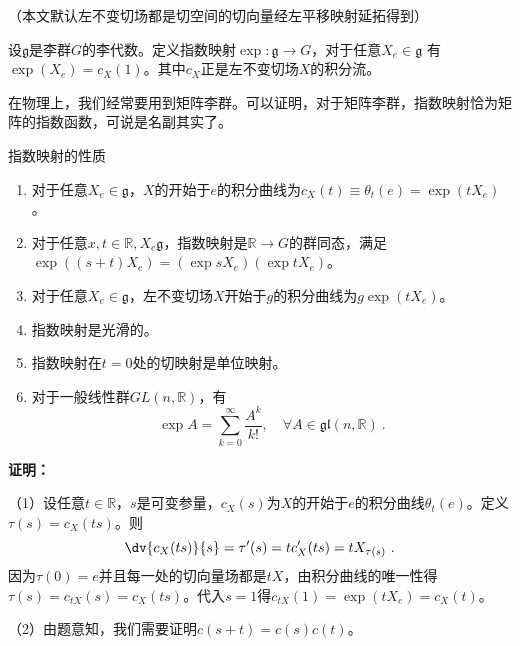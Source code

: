 
（本文默认左不变切场都是切空间的切向量经左平移映射延拓得到）
\begin{definition}{}
设$\mathfrak g$是李群$G$的李代数。定义指数映射$\exp :\mathfrak g\to G$，对于任意$X_e\in \mathfrak g$ 有$\exp (X_e)=c_X(1)$。其中$c_X$正是左不变切场$X$的积分流。
\end{definition}
在物理上，我们经常要用到矩阵李群。可以证明，对于矩阵李群，指数映射恰为矩阵的指数函数，可说是名副其实了。

\begin{theorem}{指数映射的性质}
\begin{enumerate}
\item 对于任意$X_e\in \mathfrak g$，$X$的开始于$e$的积分曲线为$c_X(t)\equiv\theta_t(e)=\exp (tX_e)$。
\item 对于任意$x,t\in\mathbb R,X_e\mathfrak g$，指数映射是$\mathbb R\to G$的群同态，满足$\exp ((s+t)X_e)=(\exp sX_e)(\exp tX_e)$。
\item 对于任意$X_e\in \mathfrak g$，左不变切场$X$开始于$g$的积分曲线为$g\exp (tX_e)$。
\item 指数映射是光滑的。
\item 指数映射在$t=0$处的切映射是单位映射。
\item 对于一般线性群$GL(n,\mathbb R)$，有
\begin{equation}
\exp  A=\sum_{k=0}^\infty\frac{A^k}{k!},\quad \forall A\in\mathfrak{gl}(n,\mathbb{R})~.
\end{equation}
\end{enumerate}
\end{theorem}

\textbf{证明：}

（1）设任意$t\in \mathbb R$，$s$是可变参量，$c_X(s)$为$X$的开始于$e$的积分曲线$\theta_t(e)$。定义$\tau(s)=c_X(ts)$。则
\begin{equation}
\dv{c_X(ts)}{s}=\tau'(s)=tc'_X(ts)=tX_{\tau (s)}~.
\end{equation}
因为$\tau(0)=e$并且每一处的切向量场都是$tX$，由积分曲线的唯一性得$\tau(s)=c_{tX}(s)=c_X(ts)$。代入$s=1$得$c_{tX}(1)=\exp(tX_e)=c_X(t)$。

（2）由题意知，我们需要证明$c(s+t)=c(s)c(t)$。